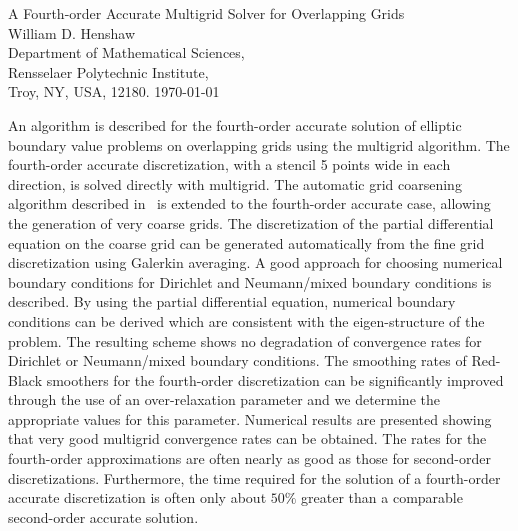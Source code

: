 \documentclass{article}
\begin{document}

\newcommand{\ogen}{/home/henshaw/res/ogen}
\newcommand{\figures}{/home/henshaw/Overture/docFigures}
\newcommand{\automg}{/home/henshaw/papers/automg}
\newcommand{\ogmgDir}{/home/henshaw/Overture/ogmg}

\newcommand{\Ogen}{{Ogen}}
\newcommand{\Overture}{{Overture}}
\newcommand{\Ogmg}{{Ogmg}}
\newcommand{\figWidth}{.495\linewidth}
\newcommand{\clipfig}{}
\newcommand{\tablefontsize}{\normalsize}




\baselineskip
\begin{flushleft}
{\Large
A Fourth-order Accurate Multigrid Solver for Overlapping Grids \\
}
\vspace{2\baselineskip}
William D. Henshaw  \\
Department of Mathematical Sciences, \\
Rensselaer Polytechnic Institute, \\
Troy, NY, USA, 12180.
\vspace{\baselineskip}
\today\\
\vspace{\baselineskip}

\vspace{4\baselineskip}

  
  An algorithm is described for the fourth-order accurate solution of elliptic boundary
value problems on overlapping grids using the multigrid algorithm. The
fourth-order accurate discretization, with a stencil 5 points wide in each
direction, is solved directly with multigrid. The automatic grid coarsening algorithm
described in~\cite{OnMultigrid} is extended to the fourth-order accurate case, allowing the
generation of very coarse grids.
%
The discretization of the partial differential equation on the
coarse grid can be generated automatically from the fine grid discretization
using Galerkin averaging.
%
A good approach for choosing numerical boundary conditions for Dirichlet and Neumann/mixed
boundary conditions is described. By using the partial differential equation, 
numerical boundary conditions
can be derived which are consistent with the eigen-structure of the problem.
The resulting scheme shows no degradation of convergence rates for Dirichlet or Neumann/mixed
boundary conditions.
%
The smoothing rates of Red-Black smoothers for the fourth-order discretization
can be significantly improved through
the use of an over-relaxation parameter and we determine the appropriate values
for this parameter.
%
Numerical results are presented showing that very good multigrid convergence rates can be obtained. 
The rates for the fourth-order approximations are often nearly as
good as those for second-order discretizations. 
Furthermore, the time required for the solution of a fourth-order accurate discretization 
is often only about $50\%$ greater than a comparable second-order accurate solution.


\end{flushleft}
\end{document}
